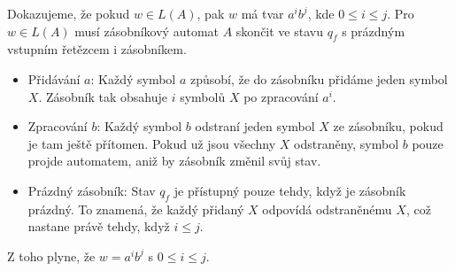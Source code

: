 Dokazujeme, že pokud $w \in L(A)$, pak $w$ má tvar $a^i b^j$, kde $0 \leq i \leq j$. Pro $w \in L(A)$ musí zásobníkový 
automat $A$ skončit ve stavu $q_f$ s prázdným vstupním řetězcem i zásobníkem.

\begin{itemize}[leftmargin=*]
    \item Přidávání $a$:
    Každý symbol $a$ způsobí, že do zásobníku přidáme jeden symbol $X$. Zásobník tak obsahuje $i$ symbolů $X$ po 
    zpracování $a^i$.
    \item Zpracování $b$:
    Každý symbol $b$ odstraní jeden symbol $X$ ze zásobníku, pokud je tam ještě přítomen. Pokud už jsou všechny $X$ 
    odstraněny, symbol $b$ pouze projde automatem, aniž by zásobník změnil svůj stav.
    \item Prázdný zásobník:
    Stav $q_f$ je přístupný pouze tehdy, když je zásobník prázdný. To znamená, že každý přidaný $X$ odpovídá 
    odstraněnému $X$, což nastane právě tehdy, když $i \leq j$.
\end{itemize}
Z toho plyne, že $w = a^i b^j$ s $0 \leq i \leq j$.
